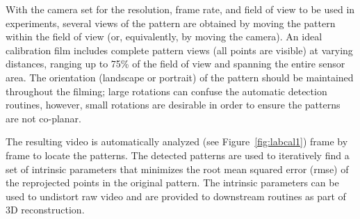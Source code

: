 \documentclass[fleqn,10pt]{wlpeerj}
\newcommand{\argus}{\texttt{argus}}
\newcommand{\simplified}{\texttt{argus\_simplified}}
\begin{document}
With the camera set for the resolution, frame rate, and field of view to be used in experiments, several views of the pattern are obtained by moving the pattern within the field of view (or, equivalently, by moving the camera). An ideal calibration film includes complete pattern views (all points are visible) at varying distances, ranging up to 75\% of the field of view and spanning the entire sensor area. The orientation (landscape or portrait) of the pattern should be maintained throughout the filming; large rotations can confuse the automatic detection routines, however, small rotations are desirable in order to ensure the patterns are not co-planar.  

The resulting video is automatically analyzed (see Figure~\ref{fig:labcal1}) frame by frame to locate the patterns.  The detected patterns are used to iteratively find a set of intrinsic parameters that minimizes the root mean squared error (rmse) of the reprojected points in the original pattern.  The intrinsic parameters can be used to undistort raw video and are provided to downstream routines as part of 3D reconstruction.  

\end{document}
